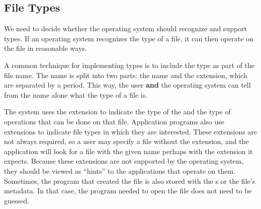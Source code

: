 \subsection{File Types}\label{subsec:File_Types}
We need to decide whether the operating system should recognize and support  types.
If an operating system recognizes the type of a file, it can then operate on the file in reasonable ways.

A common technique for implementing  types is to include the type as part of the file name.
The name is split into two parts: the name and the extension, which are separated by a period.
This way, the user \textbf{and} the operating system can tell from the name alone what the type of a file is.

The system uses the extension to indicate the type of the  and the type of operations that can be done on that file.
Application programs also use extensions to indicate file types in which they are interested.
These extensions are not always required, so a user may specify a file without the extension, and the application will look for a file with the given name perhaps with the extension it expects.
Because these extensions are not supported by the operating system, they should be viewed as ``hints'' to the applications that operate on them.
Sometimes, the program that created the file is also stored with the s or the file's metadata.
In that case, the program needed to open the file does not need to be guessed.


